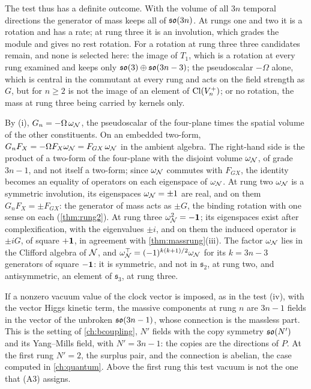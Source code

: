 The test thus has a definite outcome. With the volume of all $3n$ temporal directions the generator of mass keeps all of $\mathfrak{so}(3n)$. At rungs
one and two it is a rotation and has a rate; at rung three it is an involution, which grades the module and gives no rest rotation. For a
rotation at rung three three candidates remain, and none is selected here: the image of $T_1$, which is a rotation at every rung examined
and keeps only $\mathfrak{so}(3)\oplus\mathfrak{so}(3n-3)$; the pseudoscalar $-\Omega$ alone, which is central in the commutant at every rung and acts on the field
strength as $G$, but for $n\ge2$ is not the image of an element of $\mathrm{Cl}(V^+_n)$; or no rotation, the mass at rung three being carried by
kernels only.

\begin{remark}
\label{rem:Gn}
By (i), $G_n=-\Omega\,\omega_\mathcal N$, the pseudoscalar of the four-plane times the spatial volume of the other constituents. On an embedded
two-form, $G_nF_X=-\Omega F_X\omega_\mathcal N=F_{GX}\,\omega_\mathcal N$ in the ambient algebra. The right-hand side is the product of a two-form of the
four-plane with the disjoint volume $\omega_\mathcal N$, of grade $3n-1$, and not itself a two-form; since $\omega_\mathcal N$ commutes with $F_{GX}$, the
identity becomes an equality of operators on each eigenspace of $\omega_\mathcal N$. At rung two $\omega_\mathcal N$ is a symmetric involution, its
eigenspaces $\omega_\mathcal N=\pm1$ are real, and on them $G_nF_X=\pm F_{GX}$: the generator of mass acts as $\pm G$, the binding rotation with
one sense on each (\cref{thm:rung2}). At rung three $\omega_\mathcal N^2=-\mathbf 1$; its eigenspaces exist after complexification, with the eigenvalues
$\pm i$, and on them the induced operator is $\pm iG$, of square $+\mathbf 1$, in agreement with \cref{thm:massrung}(iii). The factor
$\omega_\mathcal N$ lies in the Clifford algebra of $\mathcal N$, and $\omega_\mathcal N^\top=(-1)^{k(k+1)/2}\omega_\mathcal N$ for its $k=3n-3$ generators of square
$-\mathbf 1$: it is symmetric, and not in $\mathfrak s_2$, at rung two, and antisymmetric, an element of $\mathfrak s_3$, at rung three.
\end{remark}

\begin{remark}
\label{rem:recovered}
If a nonzero vacuum value of the clock vector is imposed, as in the test (iv), with the vector Higgs kinetic term, the massive components at
rung $n$ are $3n-1$ fields in the vector of the unbroken $\mathfrak{so}(3n-1)$, whose connection is the massless part. This is the setting of
\cref{ch:bcoupling}, $N'$ fields with the copy symmetry $\mathfrak{so}(N')$ and its Yang--Mills field, with $N'=3n-1$: the copies are the directions of
$P$. At the first rung $N'=2$, the surplus pair, and the connection is abelian, the case computed in \cref{ch:quantum}. Above the first rung
this test vacuum is not the one that (A3) assigns.
\end{remark}

